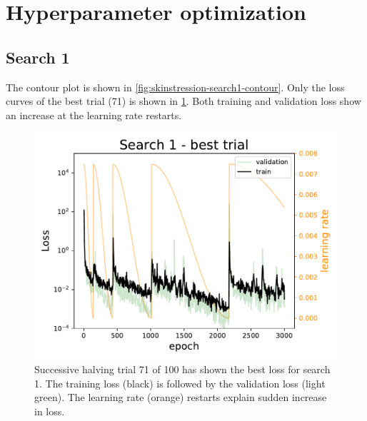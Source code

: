 
\section{Hyperparameter optimization}

\subsection{Search 1}
The contour plot is shown in \cref{fig:skinstression-search1-contour}.
Only the loss curves of the best trial (71) is shown in \cref{fig:skinstression-search1-best-loss}.
Both training and validation loss show an increase at the learning rate restarts.

\begin{figure}
    \centering
    \includegraphics[]{skinstression/images/hyperparameter-search/search-1/best-trial-loss.pdf}
    \caption[Best loss curve of search 1]{
        Successive halving trial 71 of 100 has shown the best loss for search 1.
        The training loss (black) is followed by the validation loss (light green).
        The learning rate (orange) restarts explain sudden increase in loss.
    }
    \label{fig:skinstression-search1-best-loss}
\end{figure}

